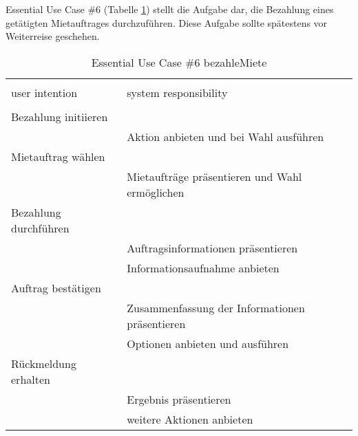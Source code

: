 \newpage
Essential Use Case \#6 (Tabelle \ref{tab:bezahlung}) stellt die Aufgabe dar, die Bezahlung eines getätigten Mietauftrages durchzuführen. Diese Aufgabe sollte spätestens vor Weiterreise geschehen.
\begin{table}[H]
\caption{Essential Use Case \#6 bezahleMiete }
\centering
\begin{tabular}{l l}
\\ [-0.5ex]

\hline\hline
\\ [-0.5ex]
user intention & system responsibility
\\ [1.5ex]
\hline
\\ [-0.5ex]
Bezahlung initiieren    &                                 \\[1ex]
                     & Aktion anbieten und bei Wahl ausführen   \\[1ex]
Mietauftrag wählen         &                                 \\[1ex] 
                     & Mietaufträge präsentieren und Wahl ermöglichen \\[1ex]
Bezahlung durchführen      &                                 \\[1ex]
                     & Auftragsinformationen präsentieren       \\[1ex]
                     & Informationsaufnahme anbieten            \\[1ex]
Auftrag bestätigen         &                                 \\[1ex]
                     & Zusammenfassung der Informationen präsentieren \\[1ex]
                     & Optionen anbieten  und ausführen         \\[1ex]
Rückmeldung erhalten    &                                       \\[1ex]
                     & Ergebnis präsentieren                  \\[1ex]
                     & weitere Aktionen anbieten                 \\[1ex]


\hline
\end{tabular}
\label{tab:bezahlung}
\end{table}


